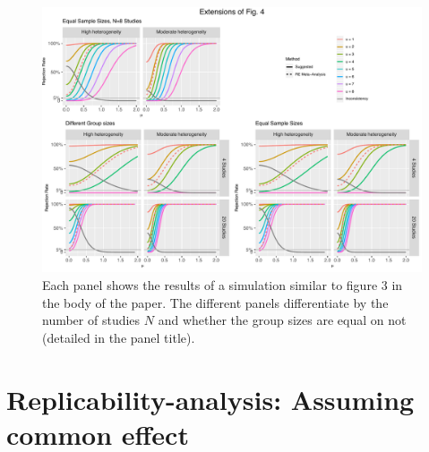 \documentclass[useAMS,usenatbib,referee]{biom}
\theoremstyle{plain}
\newtheorem*{proposition*}{Proposition 6.1}
\begin{document}
	
	\begin{figure}[htpb]
		\centering
		\includegraphics[width=\textwidth, height= 0.55\textheight]{sim3B_all.pdf} 
		\caption{ Each panel shows the results of a simulation similar to figure 3 in the body of the paper. The different panels differentiate by the number of studies $N$ and whether the group sizes are equal on not (detailed in the panel title).
		}\label{fig-sim3_extensions}
	\end{figure}
	
	
	
	
	
	
	
	\section{ Replicability-analysis: Assuming common effect }\label{sec-rvalueFE}
	
	
	
\end{document}
